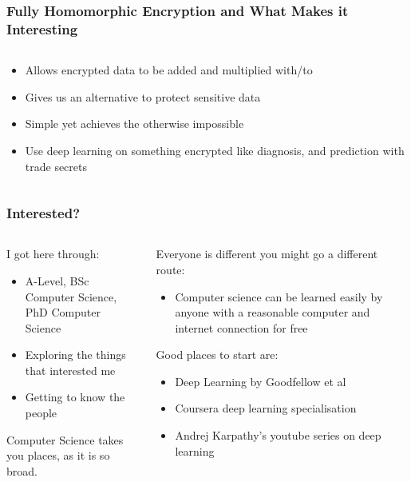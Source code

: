\documentclass[aspectratio=169]{beamer}
\begin{document}
  \begin{frame}
    \frametitle{Fully Homomorphic Encryption and What Makes it Interesting}
    \begin{columns}
      \begin{column}{0.5\textwidth}
        \begin{itemize}
          \item Allows encrypted data to be added and multiplied with/to
          \item Gives us an alternative to protect sensitive data
          \item Simple yet achieves the otherwise impossible
          \item Use deep learning on something encrypted like diagnosis, and prediction with trade secrets
        \end{itemize}
      \end{column}
    \end{columns}
  \end{frame}

  \begin{frame}
    \frametitle{Interested?}
    \begin{columns}
      \begin{column}{0.5\textwidth}
        I got here through:
        \begin{itemize}
          \item A-Level, BSc Computer Science, PhD Computer Science
          \item Exploring the things that interested me
          \item Getting to know the people
        \end{itemize}
        Computer Science takes you places, as it is so broad.
      \end{column}
      \begin{column}{0.5\textwidth}
        Everyone is different you might go a different route:
        \begin{itemize}
          \item Computer science can be learned easily by anyone with a reasonable computer and internet connection for free
        \end{itemize}
        Good places to start are:
        \begin{itemize}
            \item Deep Learning by Goodfellow et al \autocite{Goodfellow-et-al-2016}
            \item Coursera deep learning specialisation
            \item Andrej Karpathy's youtube series on deep learning
        \end{itemize}
      \end{column}
    \end{columns}
  \end{frame}
\end{document}
